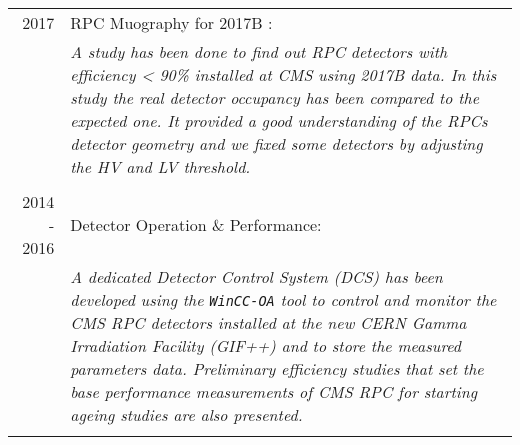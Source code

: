 \documentclass[a4paper,10pt]{article}
\begin{document}
\begin{tabular}{r|p{11.60cm}}
\quad \textsc{2017} & RPC Muography for 2017B :\\&\emph{A study has been done to find out RPC detectors with efficiency < 90\% installed at CMS using 2017B data. In this study the real detector occupancy has been compared to the expected one. It provided a good understanding of the RPCs detector geometry and we fixed some detectors by adjusting the HV and LV threshold.}\\\multicolumn{2}{c}{} \\


 \textsc{2014 - 2016} & Detector Operation \& Performance:\\&\emph{A dedicated Detector Control System (DCS) has been developed using the \texttt{WinCC-OA} tool to control and monitor the CMS RPC detectors installed at the new CERN Gamma Irradiation Facility (GIF++) and to store the measured parameters data. Preliminary efficiency studies that set the base performance measurements of CMS RPC for starting ageing studies are also presented.}\\\multicolumn{2}{c}{} 
\end{tabular}

\end{document}
